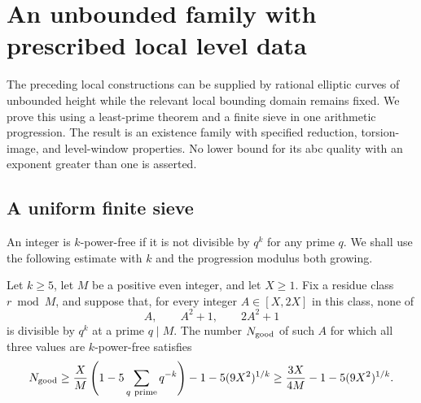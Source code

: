 \section{An unbounded family with prescribed local level data}
\label{sec:powerfree-global-family}

The preceding local constructions can be supplied by rational elliptic
curves of unbounded height while the relevant local bounding domain remains
fixed. We prove this using a least-prime theorem and a finite sieve in one
arithmetic progression. The result is an existence family with specified
reduction, torsion-image, and level-window properties. No lower bound for
its abc quality with an exponent greater than one is asserted.

\subsection{A uniform finite sieve}

An integer is \(k\)-power-free if it is not divisible by \(q^k\) for any
prime \(q\). We shall use the following estimate with \(k\) and the
progression modulus both growing.

\begin{lemma}
\label{lem:powerfree-crt-count}
Let \(k\ge5\), let \(M\) be a positive even integer, and let \(X\ge1\).
Fix a residue class \(r\bmod M\), and suppose that, for every integer
\(A\in[X,2X]\) in this class, none of
\[
 A,\qquad A^2+1,\qquad 2A^2+1
\]
is divisible by \(q^k\) at a prime \(q\mid M\). The number \(N_{\rm good}\)
of such \(A\) for which all three values are \(k\)-power-free satisfies
\begin{equation}\label{eq:pf-sieve}
 N_{\rm good}\ge
 \frac XM\left(1-5\sum_{q\ {\rm prime}}q^{-k}\right)
       -1-5(9X^2)^{1/k}
 \ge \frac{3X}{4M}-1-5(9X^2)^{1/k}.
\end{equation}
\end{lemma}

